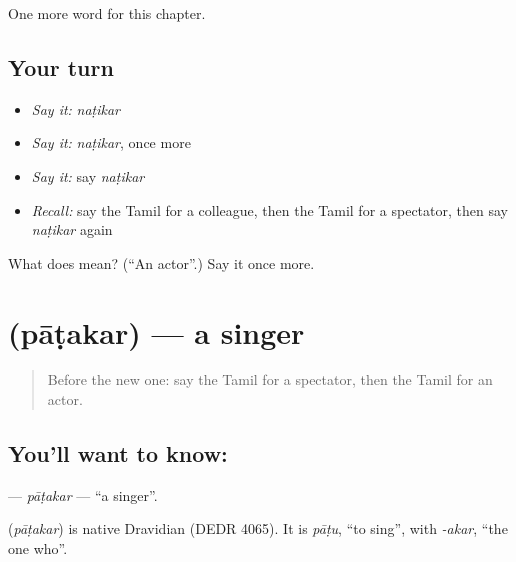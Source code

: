 \begin{grammarlens}[title={What you've built}]
One more word for this chapter.
\end{grammarlens}

\subsection*{Your turn}
\begin{itemize}
\raggedright
  \item \emph{Say it:} \emph{naṭikar}
  \item \emph{Say it:} \emph{naṭikar}, once more
  \item \emph{Say it:} say \emph{naṭikar}
  \item \emph{Recall:} say the Tamil for a colleague, then the Tamil for a spectator, then say \emph{naṭikar} again
\end{itemize}

\begin{tcolorbox}[breakable,colback=teal!4,colframe=teal!35!black,title={Before you move on}]
What does  mean? (\textquotedblleft{}An actor\textquotedblright{}.) Say it once more.
\end{tcolorbox}
\section[\texorpdfstring{\ta{பாடகர்} (pāṭakar)}{பாடகர் (pāṭakar)}]{ (pāṭakar) — a singer}

\label{lesson:TA-C193-patakar}



\begin{quote}
Before the new one: say the Tamil for a spectator, then the Tamil for an actor.
\end{quote}

\subsection*{You'll want to know: }
\textbf{} — \emph{pāṭakar} — \textquotedblleft{}a singer\textquotedblright{}.

\begin{cousinweb}
\textbf{} (\emph{pāṭakar}) is native Dravidian (DEDR 4065). It is \emph{pāṭu}, \textquotedblleft{}to sing\textquotedblright{}, with \emph{-akar}, \textquotedblleft{}the one who\textquotedblright{}.
\end{cousinweb}

